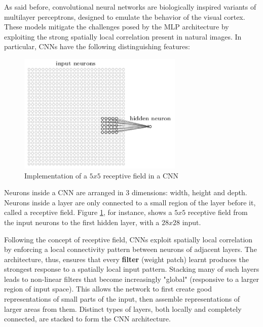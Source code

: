 As said before, convolutional neural networks are biologically inspired variants of multilayer perceptrons, designed to emulate the behavior of the visual cortex. These models mitigate the challenges posed by the \ac{MLP} architecture by exploiting the strong spatially local correlation present in natural images.
In particular, \acsp{CNN} have the following distinguishing features:

\begin{description}
	
	\begin{figure}
		\centering
		\includegraphics[width=0.7\textwidth]{Images/receptive_field}
		\caption{Implementation of a $5x5$ receptive field in a \acs{CNN}}\label{fig:receptive_field}
	\end{figure}
	
	\item[3D volumes of neurons] Neurons inside a \acs{CNN} are arranged in 3 dimensions: width, height and depth. Neurons inside a layer are only connected to a small region of the layer before it, called a receptive field. Figure \ref{fig:receptive_field}, for instance, shows a $5x5$ receptive field from the input neurons to the first hidden layer, with a $28x28$ input.
	
	\item[Local connectivity] Following the concept of receptive field, \acsp{CNN} exploit spatially local correlation by enforcing a local connectivity pattern between neurons of adjacent layers. The architecture, thus, ensures that every \textbf{filter} (\ie weight patch) learnt produces the strongest response to a spatially local input pattern. Stacking many of such layers leads to non-linear filters that become increasingly "global" (\ie responsive to a larger region of input space). This allows the network to first create good representations of small parts of the input, then assemble representations of larger areas from them.  Distinct types of layers, both locally and completely connected, are stacked to form the \acs{CNN} architecture.
	

\end{description}

